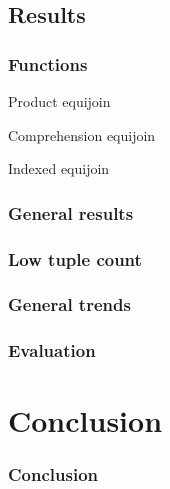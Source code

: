 \documentclass{beamer}
\begin{document}
\subsection{Results}
\begin{frame}
\frametitle{Functions}
\begin{block}{Product equijoin}
    \vspace{-4mm}
    {\scriptsize}
    \vspace{-7mm}
\end{block}\pause
\begin{block}{Comprehension equijoin}
    \vspace{-4mm}
    {\scriptsize}
    \vspace{-7mm}
\end{block}\pause
\begin{block}{Indexed equijoin}
    \vspace{-4mm}
    {\scriptsize}
    \vspace{-7mm}
\end{block}
\end{frame}

\begin{frame}
\frametitle{General results}

\begin{table}[p]
    \centering
    
    \caption{Percentage change of mean time to complete query `join onePercent
        and onePercent' when using indexed equijoin compared to other
    functions.}
    \label{tab:percentage-change-of-means-join-onePercent-and-onePercent}
\end{table}
\end{frame}

\begin{frame}
\frametitle{Low tuple count}

\end{frame}

\begin{frame}
\frametitle{General trends}

\end{frame}

\begin{frame}
\frametitle{Evaluation}
\begin{table}
{\footnotesize}
\caption{A table showing the mean time (s) and standard deviation (s) to
complete the query `join onePercent and fiftyPercent' for each function.}
\end{table}
\end{frame}

\section{Conclusion}
\begin{frame}
\frametitle{Conclusion}
\end{frame}
\end{document}
